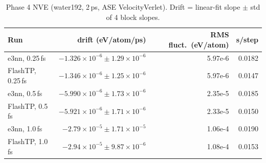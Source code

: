 \begin{table}[h]
\centering
\caption{Phase 4 NVE (water192, 2\,ps, ASE VelocityVerlet). Drift = linear-fit slope $\pm$ std of 4 block slopes.}
\label{tab:md4}
\small
\begin{tabular}{lrrr}
\toprule
Run & drift (eV/atom/ps) & RMS fluct.\ (eV/atom) & s/step \\
\midrule
e3nn, 0.25\,fs & $-1.326\times10^{-6}\pm1.29\times10^{-6}$ & 5.97e-6 & 0.0182 \\
FlashTP, 0.25\,fs & $-1.346\times10^{-6}\pm1.25\times10^{-6}$ & 5.97e-6 & 0.0147 \\
e3nn, 0.5\,fs & $-5.990\times10^{-6}\pm1.73\times10^{-6}$ & 2.35e-5 & 0.0185 \\
FlashTP, 0.5\,fs & $-5.921\times10^{-6}\pm1.71\times10^{-6}$ & 2.33e-5 & 0.0150 \\
e3nn, 1.0\,fs & $-2.79\times10^{-5}\pm1.71\times10^{-5}$ & 1.06e-4 & 0.0190 \\
FlashTP, 1.0\,fs & $-2.94\times10^{-5}\pm9.87\times10^{-6}$ & 1.08e-4 & 0.0153 \\
\bottomrule
\end{tabular}
\end{table}
